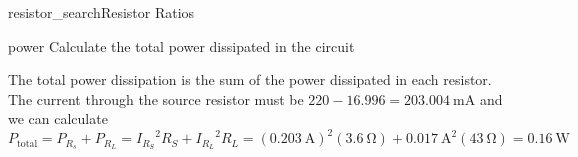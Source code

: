 \begin{mainquestion}{resistor_search}{Resistor Ratios}
\begin{partquestion}{power}
{Calculate the total power dissipated in the circuit}

\begin{answer}
The total power dissipation is the sum of the power dissipated in each resistor. The current through the source resistor must be $220 - 16.996 = \qty{203.004}{\milli\ampere}$ and we can calculate
\[
P_{\text{total}} = P_{R_s} + P_{R_L} = {I_{R_S}}^2 R_S +{I_{R_L}}^2 R_L = (\qty{0.203}{\ampere})^2(\qty{3.6}{\ohm})+\qty{0.017}{\ampere}^2(\qty{43}{\ohm}) = \qty{0.16}{\watt}
\]
\end{answer}
\end{partquestion}

\end{mainquestion}